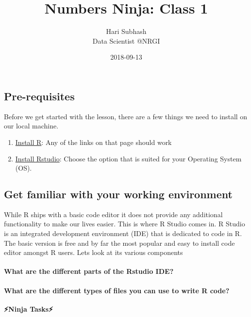 \documentclass[]{article}
\title{Numbers Ninja: Class 1}
\author{Hari Subhash\\
Data Scientist @NRGI}
\date{2018-09-13}
\providecommand{\tightlist}{%
  \setlength{\itemsep}{0pt}\setlength{\parskip}{0pt}}
\let\oldparagraph\paragraph
\renewcommand{\paragraph}[1]{\oldparagraph{#1}\mbox{}}
\begin{document}
\maketitle

\subsection{Pre-requisites}\label{pre-requisites}

Before we get started with the lesson, there are a few things we need to
install on our local machine.

\begin{enumerate}
\def\labelenumi{\arabic{enumi}.}
\tightlist
\item
  \href{https://cran.r-project.org/mirrors.html}{Install R}: Any of the
  links on that page should work
\item
  \href{https://www.rstudio.com/products/rstudio/download/}{Install
  Rstudio}: Choose the option that is suited for your Operating System
  (OS).
\end{enumerate}

\subsection{Get familiar with your working
environment}\label{get-familiar-with-your-working-environment}

While R ships with a basic code editor it does not provide any
additional functionality to make our lives easier. This is where R
Studio comes in. R Studio is an integrated development environment (IDE)
that is dedicated to code in R. The basic version is free and by far the
most popular and easy to install code editor amongst R users. Lets look
at its various components

\paragraph{What are the different parts of the Rstudio
IDE?}\label{what-are-the-different-parts-of-the-rstudio-ide}

\paragraph{What are the different types of files you can use to write R
code?}\label{what-are-the-different-types-of-files-you-can-use-to-write-r-code}

\textbf{⚡Ninja Tasks⚡}
\end{document}
